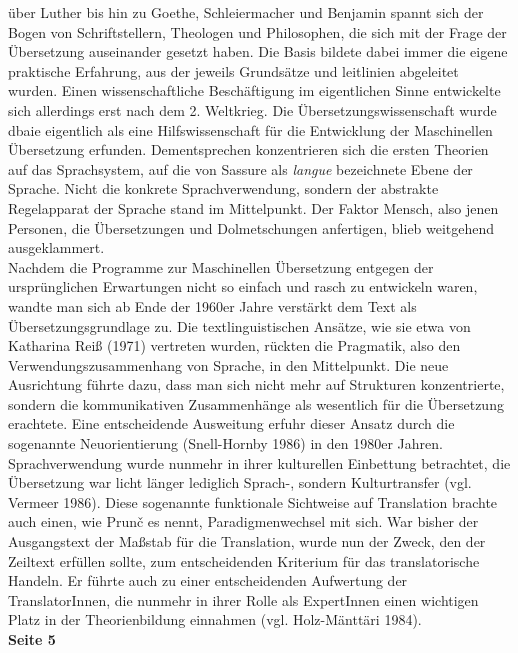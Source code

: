 \documentclass{article}
\begin{document}
	über Luther bis hin zu Goethe, Schleiermacher und Benjamin spannt sich der Bogen von Schriftstellern, Theologen und Philosophen, die sich mit der Frage der Übersetzung auseinander gesetzt haben. Die Basis bildete dabei immer die eigene praktische Erfahrung, aus der jeweils Grundsätze und leitlinien abgeleitet wurden. Einen wissenschaftliche Beschäftigung im eigentlichen Sinne entwickelte sich allerdings erst nach dem 2. Weltkrieg. Die Übersetzungswissenschaft wurde dbaie eigentlich als eine Hilfswissenschaft für die Entwicklung der Maschinellen Übersetzung \glqq erfunden\grqq. Dementsprechen konzentrieren sich die ersten Theorien auf das Sprachsystem, auf die von Sassure als \textit{langue} bezeichnete Ebene der Sprache. Nicht die konkrete Sprachverwendung, sondern der abstrakte Regelapparat der Sprache stand im Mittelpunkt. Der Faktor Mensch, also jenen Personen, die Übersetzungen und Dolmetschungen anfertigen, blieb weitgehend ausgeklammert. \\
	Nachdem die Programme zur Maschinellen Übersetzung entgegen der ursprünglichen Erwartungen nicht so einfach und rasch zu entwickeln waren, wandte man sich ab Ende der 1960er Jahre verstärkt dem Text als Übersetzungsgrundlage zu. Die textlinguistischen Ansätze, wie sie etwa von Katharina Reiß (1971) vertreten wurden, rückten die Pragmatik, also den Verwendungszusammenhang von Sprache, in den Mittelpunkt. Die neue Ausrichtung führte dazu, dass man sich nicht mehr auf Strukturen konzentrierte, sondern die kommunikativen Zusammenhänge als wesentlich für die Übersetzung erachtete. Eine entscheidende Ausweitung erfuhr dieser Ansatz durch die sogenannte \glqq Neuorientierung\grqq \: (Snell-Hornby 1986) in den 1980er Jahren. Sprachverwendung wurde nunmehr in ihrer kulturellen Einbettung betrachtet, die Übersetzung war licht länger lediglich Sprach-, sondern Kulturtransfer (vgl. Vermeer 1986). Diese sogenannte funktionale Sichtweise auf Translation brachte auch einen, wie Prun\v c es nennt, \glqq Paradigmenwechsel\grqq \: mit sich. War bisher der Ausgangstext der Maßstab für die Translation, wurde nun der Zweck, den der Zeiltext erfüllen sollte, zum entscheidenden Kriterium für das translatorische Handeln. Er führte auch zu einer entscheidenden Aufwertung der TranslatorInnen, die nunmehr in ihrer Rolle als ExpertInnen einen wichtigen Platz in der Theorienbildung einnahmen (vgl. Holz-Mänttäri 1984). \\
	\textbf{Seite 5} \\
\end{document}
